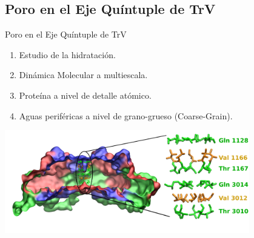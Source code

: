 \documentclass[8pt]{beamer}
\begin{document}
\subsection{Poro en el Eje Quíntuple de TrV}
\begin{frame}[t]{Poro en el Eje Quíntuple de TrV}
\hspace{-0.7cm}
\begin{minipage}{0.4\textwidth}
\justifying
\begin{enumerate}[$\bullet$]
\item Estudio de la hidratación.
\item Dinámica Molecular a multiescala.
\item Proteína a nivel de detalle atómico.
\item Aguas periféricas a nivel de grano-grueso (Coarse-Grain).
\end{enumerate}
\end{minipage}
\hfill
\begin{minipage}{0.59\textwidth}
\end{minipage}
\vspace{0.5cm}
\begin{center}
\includegraphics[width=0.8\textwidth]{Figure/TrV_Sideview_Pore.png}
    
\end{center}
\end{frame}
\end{document}
